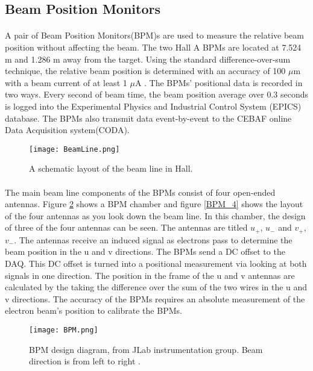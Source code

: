 	 \subsection{Beam Position Monitors}
	 \paragraph{} A pair of Beam Position Monitors(BPM)s are used to measure the relative beam position without affecting the beam. The two Hall A BPMs are located at 7.524 m and 1.286 m away from the target. Using the standard difference-over-sum technique, the relative beam position is determined with an accuracy of 100 $\mu$m with a beam current of at least 1 $\mu$A \cite{HallA}. The BPMs' positional data is recorded in two ways. Every second of beam time, the beam position average over 0.3 seconds is logged into the Experimental Physics and Industrial Control System (EPICS) database. The BPMs also transmit data event-by-event to the CEBAF online Data Acquisition system(CODA).
	 	 	 
 	 	\begin{figure}[H]
 	 		\centering
 	 		\caption{A schematic layout of the beam line in Hall. \cite{HallA} }
	 	 	\label{BeamLine}
	 	 	\texttt{[image: BeamLine.png]} 
	 	 \end{figure} 	
	 	 	
	 \paragraph{} The main beam line components of the BPMs consist of four open-ended antennas. Figure \ref{BPMimg} shows a BPM chamber and figure \ref{BPM_4} shows the layout of the four antennas as you look down the beam line. In this chamber, the design of three of the four antennas can be seen. The antennas are titled $u_+$, $u_-$ and $v_+$, $v_-$. The antennas receive an induced signal as electrons pass to determine the beam position in the u and v directions. The BPMs send a DC offset to the DAQ. This DC offset is turned into a positional measurement via looking at both signals in one direction. The position in the frame of the u and v antennas are calculated by the taking the difference over the sum of the two wires in the u and v directions. The accuracy of the BPMs requires an absolute measurement of the electron beam's position to calibrate the BPMs\cite{BPM,BPM2}.
	 	 	\begin{figure}[H]
	 	 		\centering
	 	 		\caption{BPM design diagram, from JLab instrumentation	group. Beam direction is from left to right \cite{BPM2}. }
	 	 		\label{BPMimg}
	 	 		\texttt{[image: BPM.png]} 
	 	 	\end{figure} 	
	 
